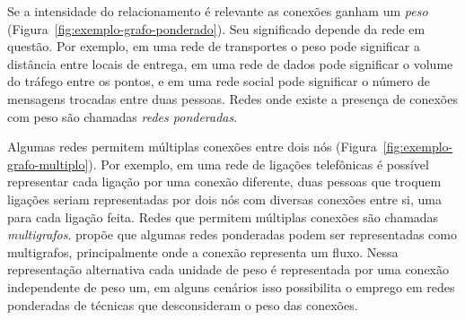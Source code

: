 \documentclass[12pt,a4paper]{article}
\theoremstyle{hypo}
\begin{document}
Se a intensidade do relacionamento é relevante as conexões ganham um \textit{peso} (Figura~\ref{fig:exemplo-grafo-ponderado}). Seu significado depende da rede em questão. Por exemplo, em uma rede de transportes o peso pode significar a distância entre locais de entrega, em uma rede de dados pode significar o volume do tráfego entre os pontos, e em uma rede social pode significar o número de mensagens trocadas entre duas pessoas. Redes onde existe a presença de conexões com peso são chamadas \textit{redes ponderadas}.

Algumas redes permitem múltiplas conexões entre dois nós (Figura~\ref{fig:exemplo-grafo-multiplo}). Por exemplo, em uma rede de ligações telefônicas é possível representar cada ligação por uma conexão diferente, duas pessoas que troquem ligações seriam representadas por dois nós com diversas conexões entre si, uma para cada ligação feita. Redes que permitem múltiplas conexões são chamadas \textit{multigrafos}.  propõe que algumas redes ponderadas podem ser representadas como multigrafos, principalmente onde a conexão representa um fluxo. Nessa representação alternativa cada unidade de peso é representada por uma conexão independente de peso um, em alguns cenários isso possibilita o emprego em redes ponderadas de técnicas que desconsideram o peso das conexões.
\end{document}
